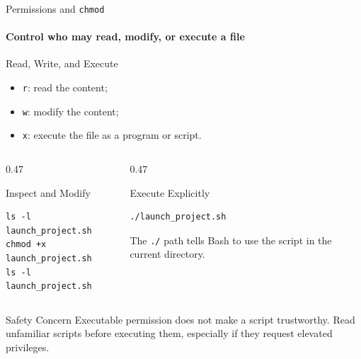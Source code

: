 \begin{frame}[fragile]{Permissions and \texttt{chmod}}
\framesubtitle{Control who may read, modify, or execute a file}

\footnotesize

\begin{block}{Read, Write, and Execute}
\begin{itemize}
    \setlength{\itemsep}{0.18em}
    \item \texttt{r}: read the content;
    \item \texttt{w}: modify the content;
    \item \texttt{x}: execute the file as a program or script.
\end{itemize}
\end{block}

\begin{columns}[T,onlytextwidth]
    \begin{column}{0.47\textwidth}
        \begin{exampleblock}{Inspect and Modify}
\begin{verbatim}
ls -l launch_project.sh
chmod +x launch_project.sh
ls -l launch_project.sh
\end{verbatim}
        \end{exampleblock}
    \end{column}

    \begin{column}{0.47\textwidth}
        \begin{exampleblock}{Execute Explicitly}
\begin{verbatim}
./launch_project.sh
\end{verbatim}
            The \texttt{./} path tells Bash to use the script in the current directory.
        \end{exampleblock}
    \end{column}
\end{columns}

\begin{alertblock}{Safety Concern}
Executable permission does not make a script trustworthy. Read unfamiliar
scripts before executing them, especially if they request elevated privileges.
\end{alertblock}
\end{frame}

